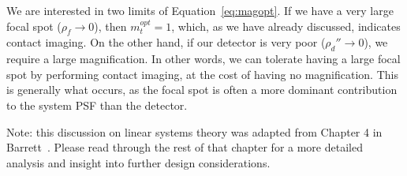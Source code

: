 \documentclass[mphy386-notes.tex]{subfiles}
\begin{document}
We are interested in two limits of Equation~\ref{eq:magopt}. If we have a very
large focal spot ($\rho_f \to 0$), then $m_t^{opt} = 1$, which, as we have already
discussed, indicates contact imaging. On the other hand, if our detector is very
poor ($\rho_d'' \to 0$), we require a large magnification. In other words, we can
tolerate having a large focal spot by performing contact imaging, at the cost of
having no magnification. This is generally what occurs, as the focal spot is
often a more dominant contribution to the system PSF than the detector.

Note: this discussion on linear systems theory was adapted from Chapter 4 in
Barrett~\cite{barrett}. Please read through the rest of that chapter for a more
detailed analysis and insight into further design considerations. 


\pagebreak
\end{document}
